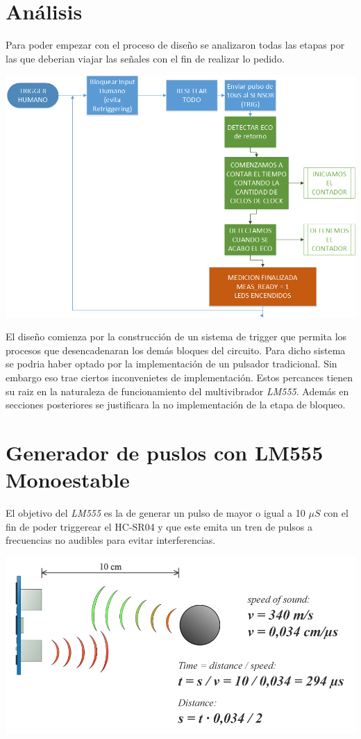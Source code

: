 \section{Análisis}
Para poder empezar con el proceso de diseño se analizaron todas las etapas por las que deberian viajar las señales con el fin de realizar lo pedido.
\begin{center}
\includegraphics[scale=0.5]{../8-UltraSound/Diagrama-de-Flujo.png}
\end{center}
El diseño comienza por la construcción de un sistema de trigger que permita los procesos que desencadenaran los demás bloques del circuito.
Para dicho sistema se podria haber optado por la implementación de un pulsador tradicional. Sin embargo eso trae ciertos inconvenietes de implementación. Estos percances tienen su raiz en la naturaleza de funcionamiento del multivibrador \emph{LM555}.
Además en secciones posteriores se justificara la no implementación de la etapa de bloqueo.
\section{Generador de puslos con LM555 Monoestable}
El objetivo del \emph{LM555} es la de generar un pulso de mayor o igual a 10 $\mu S$ con el fin de poder triggerear el HC-SR04 y que este emita un tren de pulsos a frecuencias no audibles para evitar interferencias.

\begin{center}
\includegraphics[scale=0.4]{../8-UltraSound/Ultrasonic-Sensor-Equasions.png}
\end{center}

